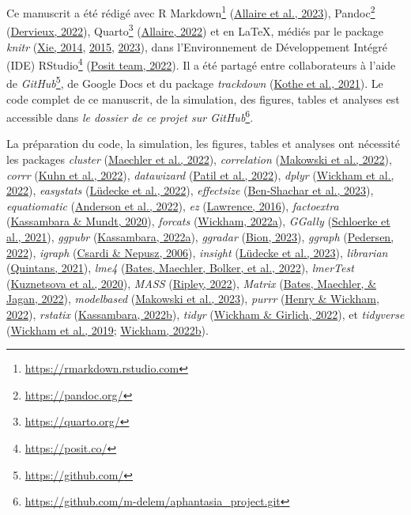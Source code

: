 \documentclass[
  12pt,
]{article}
\DeclareRobustCommand{\href}[2]{#2\footnote{\url{#1}}}
\begin{document}
Ce manuscrit a été rédigé avec \href{https://rmarkdown.rstudio.com}{R
Markdown} (\protect\hyperlink{ref-R-rmarkdown}{Allaire et al., 2023}),
\href{https://pandoc.org/}{Pandoc}
(\protect\hyperlink{ref-R-pandoc}{Dervieux, 2022}),
\href{https://quarto.org/}{Quarto}
(\protect\hyperlink{ref-R-quarto}{Allaire, 2022}) et en \LaTeX, médiés
par le package \emph{knitr} (\protect\hyperlink{ref-knitr2014}{Xie,
2014}, \protect\hyperlink{ref-knitr2015}{2015},
\protect\hyperlink{ref-R-knitr}{2023}), dans l'Environnement de
Développement Intégré (IDE) \href{https://posit.co/}{RStudio}
(\protect\hyperlink{ref-positteamRStudioIntegratedDevelopment2022}{Posit
team, 2022}). Il a été partagé entre collaborateurs à l'aide de
\href{https://github.com/}{\emph{GitHub}}, de Google Docs et du package
\emph{trackdown}
(\protect\hyperlink{ref-kotheTrackdownCollaborativeWriting2021}{Kothe et
al., 2021}). Le code complet de ce manuscrit, de la simulation, des
figures, tables et analyses est accessible dans
\href{https://github.com/m-delem/aphantasia_project.git}{\emph{le
dossier de ce projet sur GitHub}}.

La préparation du code, la simulation, les figures, tables et analyses
ont nécessité les packages \emph{cluster}
(\protect\hyperlink{ref-R-cluster}{Maechler et al., 2022}),
\emph{correlation} (\protect\hyperlink{ref-R-correlation}{Makowski et
al., 2022}), \emph{corrr} (\protect\hyperlink{ref-R-corrr}{Kuhn et al.,
2022}), \emph{datawizard} (\protect\hyperlink{ref-datawizard2022}{Patil
et al., 2022}), \emph{dplyr} (\protect\hyperlink{ref-R-dplyr}{Wickham et
al., 2022}), \emph{easystats}
(\protect\hyperlink{ref-R-easystats}{Lüdecke et al., 2022}),
\emph{effectsize} (\protect\hyperlink{ref-R-effectsize}{Ben-Shachar et
al., 2023}), \emph{equatiomatic}
(\protect\hyperlink{ref-R-equatiomatic}{Anderson et al., 2022}),
\emph{ez} (\protect\hyperlink{ref-R-ez}{Lawrence, 2016}),
\emph{factoextra} (\protect\hyperlink{ref-R-factoextra}{Kassambara \&
Mundt, 2020}), \emph{forcats}
(\protect\hyperlink{ref-R-forcats}{Wickham, 2022a}), \emph{GGally}
(\protect\hyperlink{ref-R-GGally}{Schloerke et al., 2021}),
\emph{ggpubr} (\protect\hyperlink{ref-R-ggpubr}{Kassambara, 2022a}),
\emph{ggradar} (\protect\hyperlink{ref-R-ggradar}{Bion, 2023}),
\emph{ggraph} (\protect\hyperlink{ref-R-ggraph}{Pedersen, 2022}),
\emph{igraph} (\protect\hyperlink{ref-igraph2006}{Csardi \& Nepusz,
2006}), \emph{insight} (\protect\hyperlink{ref-R-insight}{Lüdecke et
al., 2023}), \emph{librarian}
(\protect\hyperlink{ref-R-librarian}{Quintans, 2021}), \emph{lme4}
(\protect\hyperlink{ref-R-lme4}{Bates, Maechler, Bolker, et al., 2022}),
\emph{lmerTest} (\protect\hyperlink{ref-R-lmerTest}{Kuznetsova et al.,
2020}), \emph{MASS} (\protect\hyperlink{ref-R-MASS}{Ripley, 2022}),
\emph{Matrix} (\protect\hyperlink{ref-R-Matrix}{Bates, Maechler, \&
Jagan, 2022}), \emph{modelbased}
(\protect\hyperlink{ref-R-modelbased}{Makowski et al., 2023}),
\emph{purrr} (\protect\hyperlink{ref-R-purrr}{Henry \& Wickham, 2022}),
\emph{rstatix} (\protect\hyperlink{ref-R-rstatix}{Kassambara, 2022b}),
\emph{tidyr} (\protect\hyperlink{ref-R-tidyr}{Wickham \& Girlich,
2022}), et \emph{tidyverse}
(\protect\hyperlink{ref-tidyverse2019}{Wickham et al., 2019};
\protect\hyperlink{ref-R-tidyverse}{Wickham, 2022b}).
\end{document}
